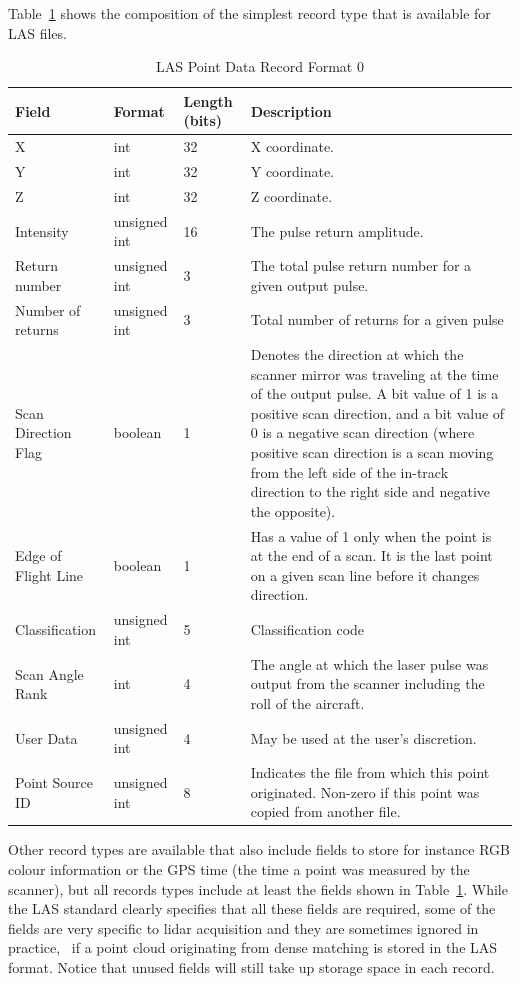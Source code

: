Table~\ref{tab:las-record} shows the composition of the simplest record type that is available for LAS files.
\begin{table}
  \centering
  \small
  \begin{tabular}{l|l|l|p{7cm}}
    Field & Format & Length (bits) & Description\\ \midrule
    X & int & 32 & X coordinate. \\ 
    Y & int & 32 & Y coordinate. \\ 
    Z & int & 32 & Z coordinate. \\ 
    Intensity & unsigned int & 16 & The pulse return amplitude. \\ 
    Return number & unsigned int & 3 &  The total pulse return number for a given output pulse. \\ 
    Number of returns & unsigned int & 3 & Total number of returns for a given pulse \\ 
    Scan Direction Flag & boolean & 1 & Denotes the direction at which the scanner mirror was traveling at the time of the output pulse. A bit value of 1 is a positive scan direction, and a bit value of 0 is a negative scan direction (where positive scan direction is a scan moving from the left side of the in-track direction to the right side and negative the opposite).  \\ 
    Edge of Flight Line & boolean & 1 & Has a value of 1 only when the point is at the end of a scan. It is the last point on a given scan line before it changes direction. \\ 
    Classification & unsigned int & 5 & Classification code \\ 
    Scan Angle Rank & int & 4 & The angle at which the laser pulse was output from the scanner including the roll of the aircraft. \\ 
    User Data & unsigned int & 4 & May be used at the user's discretion. \\ 
    Point Source ID & unsigned int & 8 & Indicates the file from which this point originated. Non-zero if this point was copied from another file.
  \end{tabular}
\caption{LAS Point Data Record Format 0}
\label{tab:las-record}
\end{table}
Other record types are available that also include fields to store for instance  RGB colour information or the GPS time (the time a point was measured by the scanner), but all records types include at least the fields shown in Table~\ref{tab:las-record}.
While the LAS standard clearly specifies that all these fields are required, some of the fields are very specific to lidar acquisition and they are sometimes ignored in practice, \eg\ if a point cloud originating from dense matching is stored in the LAS format. 
Notice that unused fields will still take up storage space in each record.

